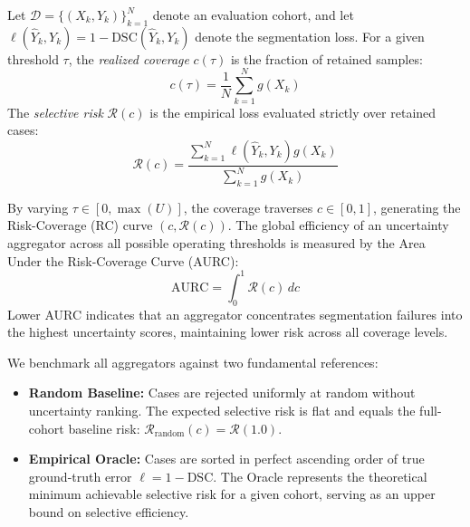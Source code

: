 \documentclass[10pt,journal,compsoc]{IEEEtran}
\begin{document}
Let $\mathcal{D} = \{(X_k, Y_k)\}_{k=1}^N$ denote an evaluation cohort, and let $\ell(\hat{Y}_k, Y_k) = 1 - \mathrm{DSC}(\hat{Y}_k, Y_k)$ denote the segmentation loss. For a given threshold $\tau$, the \emph{realized coverage} $c(\tau)$ is the fraction of retained samples:
\begin{equation}
c(\tau) = \frac{1}{N} \sum_{k=1}^N g(X_k)
\end{equation}
The \emph{selective risk} $\mathcal{R}(c)$ is the empirical loss evaluated strictly over retained cases:
\begin{equation}
\mathcal{R}(c) = \frac{\sum_{k=1}^N \ell(\hat{Y}_k, Y_k) g(X_k)}{\sum_{k=1}^N g(X_k)}
\end{equation}

By varying $\tau \in [0, \max(U)]$, the coverage traverses $c \in [0, 1]$, generating the Risk-Coverage (RC) curve $(c, \mathcal{R}(c))$. The global efficiency of an uncertainty aggregator across all possible operating thresholds is measured by the Area Under the Risk-Coverage Curve (AURC):
\begin{equation}
\mathrm{AURC} = \int_{0}^1 \mathcal{R}(c) \, dc
\end{equation}
Lower AURC indicates that an aggregator concentrates segmentation failures into the highest uncertainty scores, maintaining lower risk across all coverage levels.

We benchmark all aggregators against two fundamental references:
\begin{itemize}
    \item \textbf{Random Baseline:} Cases are rejected uniformly at random without uncertainty ranking. The expected selective risk is flat and equals the full-cohort baseline risk: $\mathcal{R}_{\mathrm{random}}(c) = \mathcal{R}(1.0)$.
    \item \textbf{Empirical Oracle:} Cases are sorted in perfect ascending order of true ground-truth error $\ell = 1 - \mathrm{DSC}$. The Oracle represents the theoretical minimum achievable selective risk for a given cohort, serving as an upper bound on selective efficiency.
\end{itemize}
\end{document}
